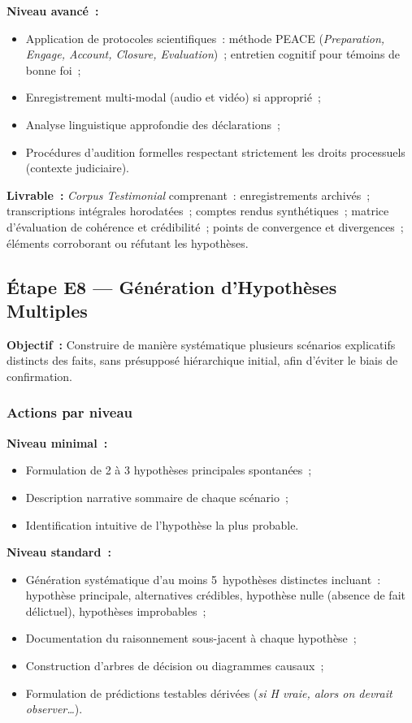\textbf{Niveau avancé~:}
\begin{itemize}
    \item Application de protocoles scientifiques~: méthode PEACE
          (\textit{Preparation, Engage, Account, Closure, Evaluation})~;
          entretien cognitif pour témoins de bonne foi~;
    \item Enregistrement multi-modal (audio et vidéo) si approprié~;
    \item Analyse linguistique approfondie des déclarations~;
    \item Procédures d'audition formelles respectant strictement les droits
          processuels (contexte judiciaire).
\end{itemize}

\textbf{Livrable~:} \textit{Corpus Testimonial} comprenant~: enregistrements
archivés~; transcriptions intégrales horodatées~; comptes rendus synthétiques~;
matrice d'évaluation de cohérence et crédibilité~; points de convergence et
divergences~; éléments corroborant ou réfutant les hypothèses.

\subsection{Étape E8 --- Génération d'Hypothèses Multiples}

\textbf{Objectif~:} Construire de manière systématique plusieurs scénarios
explicatifs distincts des faits, sans présupposé hiérarchique initial,
afin d'éviter le biais de confirmation.

\subsubsection*{Actions par niveau}

\textbf{Niveau minimal~:}
\begin{itemize}
    \item Formulation de 2 à 3 hypothèses principales spontanées~;
    \item Description narrative sommaire de chaque scénario~;
    \item Identification intuitive de l'hypothèse la plus probable.
\end{itemize}

\textbf{Niveau standard~:}
\begin{itemize}
    \item Génération systématique d'au moins 5~hypothèses distinctes incluant~:
          hypothèse principale, alternatives crédibles, hypothèse nulle
          (absence de fait délictuel), hypothèses improbables~;
    \item Documentation du raisonnement sous-jacent à chaque hypothèse~;
    \item Construction d'arbres de décision ou diagrammes causaux~;
    \item Formulation de prédictions testables dérivées
          (\textit{si H vraie, alors on devrait observer\ldots}).
\end{itemize}

